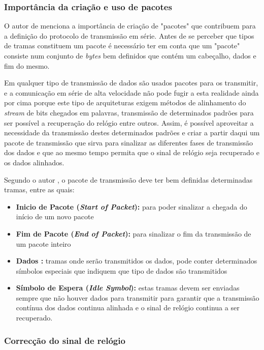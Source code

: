 \subsubsection*{Importância da criação e uso de pacotes}

O autor de \cite{R032} menciona a importância de criação de "pacotes" que contribuem para a definição do protocolo de transmissão em série. Antes de se perceber que tipos de tramas constituem um pacote é necessário ter em conta que um "pacote" consiste num conjunto de \textit{bytes} bem definidos que contém um cabeçalho, dados e fim do mesmo.

Em qualquer tipo de transmissão de dados são usados pacotes para os transmitir, e a comunicação em série de alta velocidade não pode fugir a esta realidade ainda por cima porque este tipo de arquiteturas exigem métodos de alinhamento do \textit{stream} de bits chegados em palavras, transmissão de determinados padrões para ser possível a recuperação do relógio entre outros. Assim, é possível aproveitar a necessidade da transmissão destes determinados padrões e criar a partir daqui um pacote de transmissão que sirva para sinalizar as diferentes fases de transmissão dos dados e que ao mesmo tempo permita que o sinal de relógio seja recuperado e os dados alinhados.

Segundo o autor \cite{R032}, o pacote de transmissão deve ter bem definidas determinadas tramas, entre as quais:
\begin{itemize}
	\item \textbf{Inicio de Pacote (\textit{Start of Packet}): }para poder sinalizar a chegada do início de um novo pacote
	\item \textbf{Fim de Pacote (\textit{End of Packet}):} para sinalizar o fim da transmissão de um pacote inteiro
	\item\textbf{Dados :} tramas onde serão transmitidos os dados, pode conter determinados símbolos especiais que indiquem que tipo de dados são transmitidos
	\item \textbf{Símbolo de Espera (\textit{Idle Symbol}):} estas tramas devem ser enviadas sempre que não houver dados para transmitir para garantir que a transmissão contínua dos dados continua alinhada e o sinal de relógio continua a ser recuperado.
\end{itemize}


\subsubsection*{Correcção do sinal de relógio}
	
